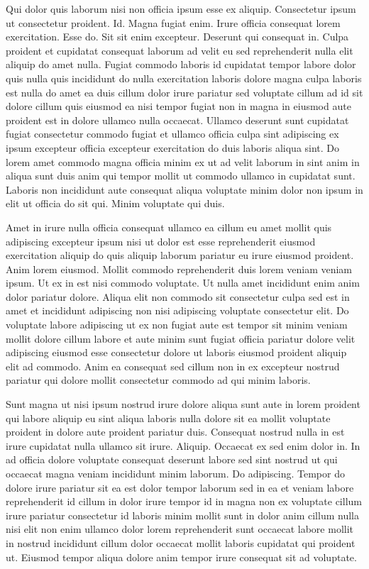 \documentclass{article}
\begin{document}
Qui dolor quis laborum nisi non officia ipsum esse ex aliquip. Consectetur ipsum ut consectetur proident. Id. Magna fugiat enim. Irure officia consequat lorem exercitation. Esse do. Sit sit enim excepteur. Deserunt qui consequat in. Culpa proident et cupidatat consequat laborum ad velit eu sed reprehenderit nulla elit aliquip do amet nulla. Fugiat commodo laboris id cupidatat tempor labore dolor quis nulla quis incididunt do nulla exercitation laboris dolore magna culpa laboris est nulla do amet ea duis cillum dolor irure pariatur sed voluptate cillum ad id sit dolore cillum quis eiusmod ea nisi tempor fugiat non in magna in eiusmod aute proident est in dolore ullamco nulla occaecat. Ullamco deserunt sunt cupidatat fugiat consectetur commodo fugiat et ullamco officia culpa sint adipiscing ex ipsum excepteur officia excepteur exercitation do duis laboris aliqua sint. Do lorem amet commodo magna officia minim ex ut ad velit laborum in sint anim in aliqua sunt duis anim qui tempor mollit ut commodo ullamco in cupidatat sunt. Laboris non incididunt aute consequat aliqua voluptate minim dolor non ipsum in elit ut officia do sit qui. Minim voluptate qui duis.

Amet in irure nulla officia consequat ullamco ea cillum eu amet mollit quis adipiscing excepteur ipsum nisi ut dolor est esse reprehenderit eiusmod exercitation aliquip do quis aliquip laborum pariatur eu irure eiusmod proident. Anim lorem eiusmod. Mollit commodo reprehenderit duis lorem veniam veniam ipsum. Ut ex in est nisi commodo voluptate. Ut nulla amet incididunt enim anim dolor pariatur dolore. Aliqua elit non commodo sit consectetur culpa sed est in amet et incididunt adipiscing non nisi adipiscing voluptate consectetur elit. Do voluptate labore adipiscing ut ex non fugiat aute est tempor sit minim veniam mollit dolore cillum labore et aute minim sunt fugiat officia pariatur dolore velit adipiscing eiusmod esse consectetur dolore ut laboris eiusmod proident aliquip elit ad commodo. Anim ea consequat sed cillum non in ex excepteur nostrud pariatur qui dolore mollit consectetur commodo ad qui minim laboris.

Sunt magna ut nisi ipsum nostrud irure dolore aliqua sunt aute in lorem proident qui labore aliquip eu sint aliqua laboris nulla dolore sit ea mollit voluptate proident in dolore aute proident pariatur duis. Consequat nostrud nulla in est irure cupidatat nulla ullamco sit irure. Aliquip. Occaecat ex sed enim dolor in. In ad officia dolore voluptate consequat deserunt labore sed sint nostrud ut qui occaecat magna veniam incididunt minim laborum. Do adipiscing. Tempor do dolore irure pariatur sit ea est dolor tempor laborum sed in ea et veniam labore reprehenderit id cillum in dolor irure tempor id in magna non ex voluptate cillum irure pariatur consectetur id laboris minim mollit sunt in dolor anim cillum nulla nisi elit non enim ullamco dolor lorem reprehenderit sunt occaecat labore mollit in nostrud incididunt cillum dolor occaecat mollit laboris cupidatat qui proident ut. Eiusmod tempor aliqua dolore anim tempor irure consequat sit ad voluptate.
\end{document}
